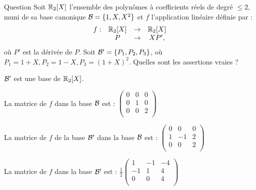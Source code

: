 \begin{multi}[multiple,feedback=
{La matrice de \(f\) d'une base \({\cal {B}}=(u_j)\) dans une  base \( {\cal {B}}'=(v_i)\) est la matrice  dont la \(j\)ième colonne est constituée des coordonnées de  \(f(u_j)\) dans la base \( {\cal {B}}'\). La matrice de \(f\) dans la base \( {\cal {B'}}\) est : \(
\frac{1}{2}\left(\begin{array}{rcc}
1&-1&-4\\
-1&1&0\\ 
0&0&4\\
\end{array}\right).\)
}]{Question}
Soit \(\mathbb{R}_2[X]\) l'ensemble des polynômes à coefficients réels de degré \(\le 2\), muni de sa base canonique \({\cal {B}} = \{1,X,X^2\}\) et \(f\) l'application linéaire définie par : 
\[\begin{array}{rccc}f:&\mathbb{R}_2[X] &\to& \mathbb{R}_2[X]\\
& P&\to &XP', \end{array}\]
où \(P'\) est la dérivée de \(P\). Soit \({\cal {B'}} = \{P_1,P_2,P_3\}\), où \(P_1=1+X, P_2=1-X, P_3=(1+X)^2\). Quelles sont les assertions vraies ?

    \item* \({\cal {B'}}\) est une base de  \(\mathbb{R}_2[X]\).
    \item* La matrice de \(f\) dans la base \( {\cal {B}}\) est : \(
\left(\begin{array}{rcc}
0&0&0\\
0&1&0\\
0&0&2\\
\end{array}\right)\)
    \item* La matrice de \(f\) de la base \( {\cal {B'}}\) dans la base \( {\cal {B}}\) est : \(
\left(\begin{array}{rcc}
0&0&0\\
1&-1&2\\
0&0&2\\
\end{array}\right)\)
    \item La matrice de \(f\) dans la base \( {\cal {B'}}\) est : \(
\frac{1}{2}\left(\begin{array}{rcc}
1&-1&-4\\
-1&1&4\\
0&0&4\\
\end{array}\right)\)
\end{multi}


